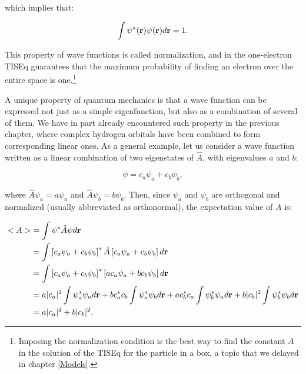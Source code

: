 \documentclass[
  9pt,
]{extbook}
\theoremstyle{definition}
\theoremstyle{definition}
\theoremstyle{definition}
\theoremstyle{remark}
\begin{document}
which implies that:

\begin{equation}
\int \psi^{*}({\bf r}) \psi({\bf r}) d{\bf r} = 1.
\label{eq:ee4}
\end{equation}

This property of wave functions is called normalization, and in the one-electron TISEq guarantees that the maximum probability of finding an electron over the entire space is one.\footnote{Imposing the normalization condition is the best way to find the constant \(A\) in the solution of the TISEq for the particle in a box, a topic that we delayed in chapter \ref{Models}.}

A unique property of quantum mechanics is that a wave function can be expressed not just as a simple eigenfunction, but also as a combination of several of them. We have in part already encountered such property in the previous chapter, where complex hydrogen orbitals have been combined to form corresponding linear ones. As a general example, let us consider a wave function written as a linear combination of two eigenstates of \(\hat{A}\), with eigenvalues \(a\) and \(b\):

\begin{equation}
\psi = c_a \psi_a + c_b \psi_b,
\label{eq:ee5}
\end{equation}

where \(\hat{A} \psi_a = a \psi_a\) and \(\hat{A} \psi_b = b \psi_b\). Then, since \(\psi_a\) and \(\psi_b\) are orthogonal and normalized (usually abbreviated as orthonormal), the expectation value of \(A\) is:

\begin{equation}
\begin{aligned}
<A> &= \int \psi^{*} \hat{A} \psi d{\bf r} \\
    &= \int \left[ c_a \psi_a + c_b \psi_b \right]^{*} \hat{A} \left[ c_a \psi_a + c_b \psi_b \right] d{\bf r}\\
    &= \int \left[ c_a \psi_a + c_b \psi_b \right]^{*}
\left[ a c_a \psi_a + b c_b \psi_b \right] d{\bf r}\\    
    &= a \vert c_a\vert^2 \int \psi_a^{*} \psi_a d{\bf r} +
b c_a^{*} c_b \int \psi_a^{*} \psi_b d{\bf r} + a c_b^{*} c_a \int \psi_b^{*} \psi_a d{\bf r} +
b \vert c_b\vert^2 \int \psi_b^{*} \psi_b d{\bf r}\\ 
    &= a \vert c_a\vert^2 + b \vert c_b\vert^2.
\end{aligned}
\label{eq:ee6}    
\end{equation}
\end{document}
